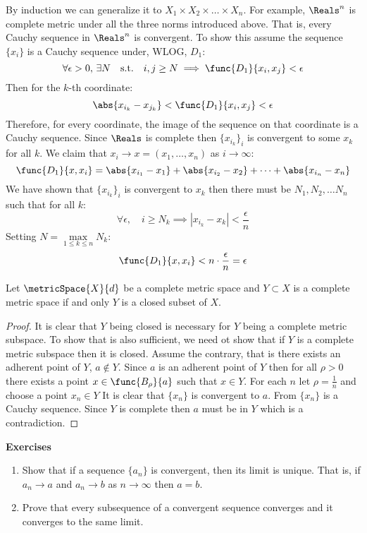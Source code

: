 By induction we can generalize it to \(X_1 \times X_2 \times \dots \times X_n\). For example, \(\Reals^n\) is complete metric under all the three norms introduced above. That is, every Cauchy sequence in \(\Reals^n\) is convergent. To show this assume the sequence \(\{ x_i \}\) is a Cauchy sequence under, WLOG, \(D_1\):
\[ \forall \epsilon > 0, \, \exists N \quad \mathrm{s.t.} \quad i,j \geq N \implies \func{D_1}{x_i,x_j} < \epsilon \]
Then for the \(k\)-th coordinate:
\[ \abs{x_{i_k} - x_{j_k}}  < \func{D_1}{x_i,x_j}  < \epsilon \]
Therefore, for every coordinate, the image of the sequence on that coordinate is a Cauchy sequence. Since \(\Reals\) is complete then \(\{ x_{i_k} \} _i\) is convergent to some \(x_k\) for all \(k\). We claim that \(x_i \to x = (x_1, \dots, x_n)\) as \(i \to \infty\):
\[ \func{D_1}{x,x_i} = \abs{x_{i_1} - x_1} + \abs{x_{i_2} - x_2}  + \dots + \abs{x_{i_n} - x_n} \]
We have shown that \(\{ x_{i_k}\} _i\) is convergent to \(x_k\) then there must be \(N_1,N_2, \dots N_n\) such that for all \(k\):
\[\forall \epsilon,\quad i \geq N_k \implies |x_{i_k} - x_k| < \frac{\epsilon}{n}\]
Setting \( N = \underset{1 \leq k \leq n}{\max}{N_k} \):
\[\func{D_1}{x,x_i} < n \cdot \frac{\epsilon}{n} = \epsilon\]

\begin{theorem}
    Let \(\metricSpace{X}{d}\) be a complete metric space and \(Y \subset X\) is a complete metric space if and only \(Y\) is a closed subset of \(X\).
\end{theorem}

\begin{proof}
    It is clear that \(Y\) being closed is necessary for \(Y\) being a complete metric subspace. To show that is also sufficient, we need ot show that if \(Y\) is a complete metric subspace then it is closed. Assume the contrary, that is there exists an adherent point of \(Y\), \(a \notin Y\). Since \(a\) is an adherent point of \(Y\) then for all \(\rho > 0\) there exists a point \(x \in \func{B_\rho}{a}\) such that \(x \in Y\). For each \(n\) let \(\rho = \frac{1}{n}\) and choose a point \(x_n \in Y\)
    It is clear that \(\{ x_n \}\) is convergent to \(a\). From  \(\{ x_n \}\) is a Cauchy sequence. Since \(Y\) is complete then \(a\) must be in \(Y\) which is a contradiction.
\end{proof}
{\Large\textbf{Exercises}}
\begin{enumerate}
    \item Show that if a sequence \(\{ a_n \}\) is convergent, then its limit is unique. That is, if \(a_n \to a \) and \(a_n \to b\) as \(n \to \infty\) then \(a = b\).
    \item Prove that every subsequence of a convergent sequence converges and it converges to the same limit.
\end{enumerate}
\newpage

